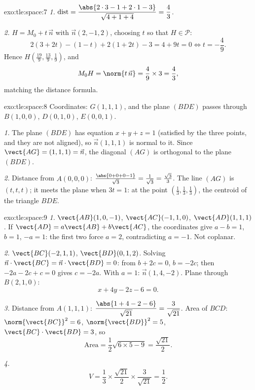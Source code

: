 \begin{solution}{exo:tle:space:7}
\emph{1.} $\operatorname{dist} = \dfrac{\abs{2\cdot3 - 1 + 2\cdot1 - 3}}
{\sqrt{4 + 1 + 4}} = \dfrac{4}{3}$.

\emph{2.} $H = M_0 + t\,\vec n$ with $\vec n(2, -1, 2)$, choosing $t$ so
that $H \in \mathcal P$:
\[
2(3 + 2t) - (1 - t) + 2(1 + 2t) - 3 = 4 + 9t = 0 \iff t = -\frac49 .
\]
Hence $H\left(\frac{19}{9}, \frac{13}{9}, \frac19\right)$, and
\[
M_0H = \norm{t\,\vec n} = \frac49 \times 3 = \frac43,
\]
matching the distance formula.
\end{solution}

\begin{solution}{exo:tle:space:8}
Coordinates: $G(1,1,1)$, and the plane $(BDE)$ passes through $B(1,0,0)$,
$D(0,1,0)$, $E(0,0,1)$.

\emph{1.} The plane $(BDE)$ has equation $x + y + z = 1$ (satisfied by the
three points, and they are not aligned), so $\vec n(1,1,1)$ is normal to
it. Since $\vect{AG} = (1,1,1) = \vec n$, the diagonal $(AG)$ is orthogonal
to the plane $(BDE)$.

\emph{2.} Distance from $A(0,0,0)$:
$\frac{\abs{0 + 0 + 0 - 1}}{\sqrt3} = \frac{1}{\sqrt3} = \frac{\sqrt3}{3}$.
The line $(AG)$ is $(t, t, t)$; it meets the plane when $3t = 1$: at the
point $\left(\frac13, \frac13, \frac13\right)$, the centroid of the
triangle $BDE$.
\end{solution}

\begin{solution}{exo:tle:space:9}
\emph{1.} $\vect{AB}(1, 0, -1)$, $\vect{AC}(-1, 1, 0)$,
$\vect{AD}(1, 1, 1)$. If $\vect{AD} = a\vect{AB} + b\vect{AC}$, the
coordinates give $a - b = 1$, $b = 1$, $-a = 1$: the first two force
$a = 2$, contradicting $a = -1$. Not coplanar.

\emph{2.} $\vect{BC}(-2, 1, 1)$, $\vect{BD}(0, 1, 2)$. Solving
$\vec n \cdot \vect{BC} = \vec n \cdot \vect{BD} = 0$: from
$b + 2c = 0$, $b = -2c$; then $-2a - 2c + c = 0$ gives $c = -2a$. With
$a = 1$: $\vec n(1, 4, -2)$. Plane through $B(2,1,0)$:
\[
x + 4y - 2z - 6 = 0 .
\]

\emph{3.} Distance from $A(1,1,1)$:
$\dfrac{\abs{1 + 4 - 2 - 6}}{\sqrt{21}} = \dfrac{3}{\sqrt{21}}$.
Area of $BCD$: $\norm{\vect{BC}}^2 = 6$, $\norm{\vect{BD}}^2 = 5$,
$\vect{BC}\cdot\vect{BD} = 3$, so
\[
\text{Area} = \frac12\sqrt{6 \times 5 - 9} = \frac{\sqrt{21}}{2}.
\]

\emph{4.}
\[
V = \frac13 \times \frac{\sqrt{21}}{2} \times \frac{3}{\sqrt{21}}
= \frac12 .
\]
\end{solution}
